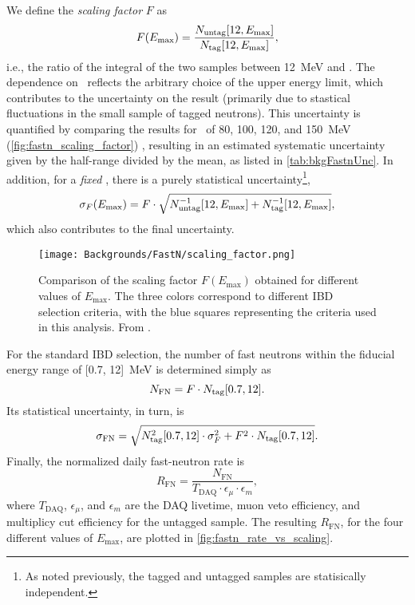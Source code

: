 \documentclass[../thesis.tex]{subfiles}
\begin{document}
We define the \emph{scaling factor} $F$ as
\begin{equation}
  F(E_\mathrm{max}) = \frac{N_\mathrm{untag}[12, E_\mathrm{max}]}{N_\mathrm{tag}[12, E_\mathrm{max}]},
\end{equation}
i.e., the ratio of the integral of the two samples between 12~MeV and \emax. The dependence on \emax\ reflects the arbitrary choice of the upper energy limit, which contributes to the uncertainty on the result (primarily due to stastical fluctuations in the small sample of tagged neutrons). This uncertainty is quantified by comparing the results for \emax\ of 80, 100, 120, and 150~MeV (\autoref{fig:fastn_scaling_factor}) \cite{fastn} , resulting in an estimated systematic uncertainty given by the half-range divided by the mean, as listed in \autoref{tab:bkgFastnUnc}. In addition, for a \emph{fixed} \emax, there is a purely statistical uncertainty\footnote{As noted previously, the tagged and untagged samples are statisically independent.},
\begin{equation}
  \sigma_F(E_\mathrm{max}) = F \cdot \sqrt{N_\mathrm{untag}^{-1}[12, E_\mathrm{max}] + N_\mathrm{tag}^{-1}[12,
      E_\mathrm{max}]},
\end{equation}
which also contributes to the final uncertainty.

\begin{figure}[h]
  \texttt{[image: Backgrounds/FastN/scaling\_factor.png]}
  \caption{Comparison of the scaling factor $F(E_{\mathrm{max}})$ obtained for different values of $E_{\mathrm{max}}$. The three colors correspond to different IBD selection criteria, with the blue squares representing the criteria used in this analysis. From \cite{fastn}.}
  \label{fig:fastn_scaling_factor}
\end{figure}

\def\nfn{\ensuremath{N_\mathrm{FN}}} \def\rfn{\ensuremath{R_\mathrm{FN}}}

For the standard IBD selection, the number of fast neutrons within the fiducial energy range of [0.7, 12]~MeV is determined simply as
\begin{equation}
  \nfn = F \cdot \ntag[0.7, 12].
\end{equation}
Its statistical uncertainty, in turn, is
\begin{equation}
  \label{eq:fastn_scal_unc}
  \sigma_\mathrm{FN} = \sqrt{N_\mathrm{tag}^2[0.7, 12]
    \cdot \sigma_F^2 + F^2 \cdot N_\mathrm{tag}[0.7, 12]}.
\end{equation}
Finally, the normalized daily fast-neutron rate is
\begin{equation}
  \label{eq:fastn_rate}
  \rfn = \frac{\nfn}{T_\mathrm{DAQ} \cdot \epsilon_\mu \cdot \epsilon_m},
\end{equation}
where $T_\mathrm{DAQ}$, $\epsilon_\mu$, and $\epsilon_m$ are the DAQ livetime, muon veto efficiency, and multiplicy cut efficiency for the untagged sample. The resulting $\rfn$, for the four different values of $E_{\mathrm{max}}$, are plotted in \autoref{fig:fastn_rate_vs_scaling}.
\end{document}
